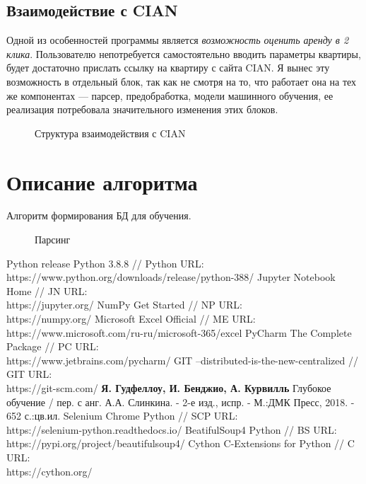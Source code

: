 \documentclass{article}
\begin{document}
		\subsection{Взаимодействие с CIAN}
		
			Одной из особенностей программы является \textit{возможность оценить аренду в 2 клика}. Пользователю непотребуется самостоятельно вводить параметры квартиры, будет достаточно прислать ссылку на квартиру с сайта CIAN. Я вынес эту возможность в отдельный блок, так как не смотря на то, что работает она на тех же компонентах --- парсер, предобработка, модели машинного обучения, ее реализация потребовала значительного изменения этих блоков.
			
			\begin{figure}[H]
				\centering
				\caption{Структура взаимодействия с CIAN}
				\label{fig:cian}
			\end{figure}
	
	\newpage
	\section{Описание алгоритма}	
		
		Алгоритм формирования БД для обучения.
		
		\begin{figure}[H]
			\centering
			\caption{Парсинг}
			\label{fig:algorithm_parsing}
		\end{figure}
		
	\newpage
	\begin{thebibliography}{}
		  Python release Python 3.8.8 // Python URL: \\ https://www.python.org/downloads/release/python-388/ 
		  Jupyter Notebook Home // JN URL: \\ https://jupyter.org/
		  NumPy Get Started // NP URL: \\ https://numpy.org/
		  Microsoft Excel Official // ME URL: \\ https://www.microsoft.com/ru-ru/microsoft-365/excel
		  PyCharm The Complete Package // PC URL: \\ https://www.jetbrains.com/pycharm/
			GIT --distributed-is-the-new-centralized // GIT URL: \\
		https://git-scm.com/
		  \textbf{Я. Гудфеллоу, И. Бенджио, А. Курвилль} Глубокое обучение / пер. с анг. А.А. Слинкина. - 2-е изд., испр. - М.:ДМК Пресс, 2018. - 652 с.:цв.ил. 
		  Selenium Chrome Python // SCP URL: \\
		https://selenium-python.readthedocs.io/
		  BeatifulSoup4 Python // BS URL: \\
		https://pypi.org/project/beautifulsoup4/
		 Cython C-Extensions for Python // C URL: \\
		https://cython.org/
	\end{thebibliography}
\end{document}
